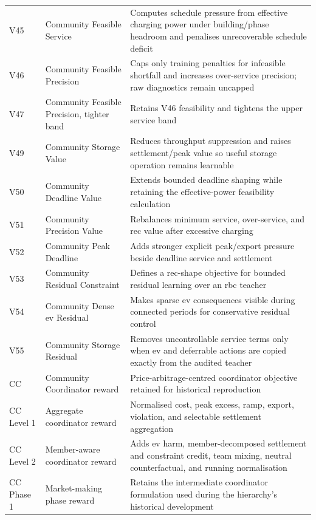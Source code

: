 \begin{longtable}{@{}p{}p{}p{}@{}}
V45 & Community Feasible Service & Computes schedule pressure from effective charging power under building/phase headroom and penalises unrecoverable schedule deficit \\
V46 & Community Feasible Precision & Caps only training penalties for infeasible shortfall and increases over-service precision; raw diagnostics remain uncapped \\
V47 & Community Feasible Precision, tighter band & Retains V46 feasibility and tightens the upper service band \\
V49 & Community Storage Value & Reduces throughput suppression and raises settlement/peak value so useful storage operation remains learnable \\
V50 & Community Deadline Value & Extends bounded deadline shaping while retaining the effective-power feasibility calculation \\
V51 & Community Precision Value & Rebalances minimum service, over-service, and \gls{rec} value after excessive charging \\
V52 & Community Peak Deadline & Adds stronger explicit peak/export pressure beside deadline service and settlement \\
V53 & Community Residual Constraint & Defines a \gls{rec}-shape objective for bounded residual learning over an \gls{rbc} teacher \\
V54 & Community Dense \gls{ev} Residual & Makes sparse \gls{ev} consequences visible during connected periods for conservative residual control \\
V55 & Community Storage Residual & Removes uncontrollable service terms only when \gls{ev} and deferrable actions are copied exactly from the audited teacher \\
CC & Community Coordinator reward & Price-arbitrage-centred coordinator objective retained for historical reproduction \\
CC Level 1 & Aggregate coordinator reward & Normalised cost, peak excess, ramp, export, violation, and selectable settlement aggregation \\
CC Level 2 & Member-aware coordinator reward & Adds \gls{ev} harm, member-decomposed settlement and constraint credit, team mixing, neutral counterfactual, and running normalisation \\
CC Phase 1 & Market-making phase reward & Retains the intermediate coordinator formulation used during the hierarchy's historical development \\
\bottomrule
\end{longtable}

